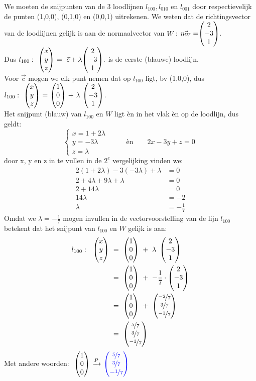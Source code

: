 
We moeten  de snijpunten van de 3 loodlijnen $ l_{100}, l_{010} $ en $ l_{001}  $ door respectievelijk de punten (1,0,0), (0,1,0) en (0,0,1) uitrekenen. We weten dat de richtingsvector van de loodlijnen gelijk is aan de normaalvector van $W$ : $\vec{n_W} = \vecdrie{2}{-3}{1}. $ \\ 
Dus  $ l_{100}: \ \ \vecdrie{x}{y}{z} \ = \  \vec{c} + \lambda \vecdrie{2}{-3}{1}. $ is de eerste (blauwe) loodlijn. \\
Voor $ \vec{c} $ mogen we elk punt  nemen dat op  $ l_{100} $ ligt, bv  (1,0,0), dus \\
$ l_{100}: \ \ \vecdrie{x}{y}{z} \ = \ \vecdrie{1}{0}{0} \ + \ \lambda \ \vecdrie{2}{-3}{1} $. \\ 
Het snijpunt (blauw) van $ l_{100} $ en $W$  ligt èn in het vlak  èn op de loodlijn, dus geldt:
\[\begin{cases}
    x = 1 + 2\lambda  \\
    y= -3\lambda   \qquad \qquad \text{èn} \qquad  2x-3y+z = 0 \\
    z= \lambda 
\end{cases}
\] 
door x, y en z in te  vullen in de $ 2^e $  vergelijking vinden we:
\begin{align*}
    2(1 + 2\lambda) - 3 (-3\lambda) + \lambda &= 0 \\
    2 + 4\lambda +9\lambda + \lambda &= 0 \\
    2+ 14\lambda  &= 0 \\
    14\lambda  &= -2 \\
    \lambda &= -\frac{1}{7}    
\end{align*}
Omdat we  $\lambda = -\frac{1}{7} $ mogen invullen in  de vectorvoorstelling van de lijn $ l_{100} $ betekent dat het snijpunt van $ l_{100} $ en $W$ gelijk is aan:
\begin{align*}
    l_{100}: \ \ \matdrie{x}{y}{z} \ &= \ \matdrie{1}{0}{0}  \ + \ \lambda \ \matdrie{2}{-3}{1}  \\
      &= \ \matdrie{1}{0}{0} \ + \ -\frac{1}{7} \cdot \matdrie{2}{-3}{1} \\
       &= \ \matdrie{1}{0}{0} \ + \ \matdrie{\nicefrac{-2}{7}}{\nicefrac{3}{7}}{\nicefrac{-1}{7}} \\
       &= \ \matdrie{\nicefrac{5}{7}}{\nicefrac{3}{7}}{\nicefrac{-1}{7}}
\end{align*}
Met andere woorden:
$ \ \vecdrie{1}{0}{0}   \  \xrightarrow{P}  \  \vecdrie[blue] {\nicefrac{5}{7} }{\nicefrac{3}{7} }{-\nicefrac{1}{7} }\ $

